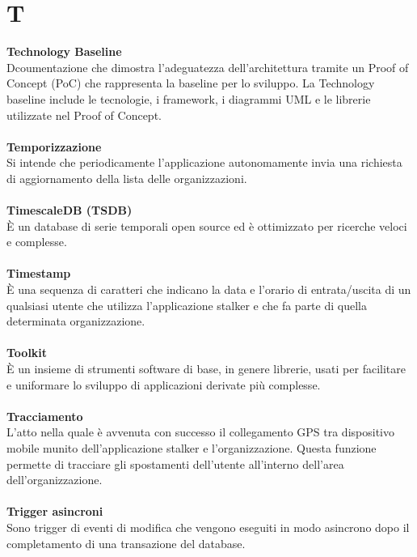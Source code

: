 \section{T}
\textbf{Technology Baseline}\\
Dcoumentazione che dimostra l'adeguatezza dell'architettura tramite un Proof of Concept (PoC) che rappresenta la baseline per lo sviluppo. La Technology baseline include le tecnologie, i framework, i diagrammi UML e le librerie utilizzate nel Proof of Concept. \\ \\
\textbf{Temporizzazione}\\
Si intende che periodicamente l'applicazione autonomamente invia una richiesta di aggiornamento della lista delle organizzazioni. \\ \\
\textbf{TimescaleDB (TSDB)}\\
È un database di serie temporali open source ed è ottimizzato per ricerche veloci e complesse. \\ \\
\textbf{Timestamp}\\
È una sequenza di caratteri che indicano la data e l'orario di entrata/uscita di un qualsiasi utente che utilizza l'applicazione stalker e che fa parte di quella determinata organizzazione. \\ \\
\textbf{Toolkit}\\
È un insieme di strumenti software di base, in genere librerie, usati per facilitare e uniformare lo sviluppo di applicazioni derivate più complesse. \\ \\
\textbf{Tracciamento}\\ 
L'atto nella quale è avvenuta con successo il collegamento GPS tra dispositivo mobile munito dell'applicazione stalker e l'organizzazione. Questa funzione permette di tracciare gli spostamenti dell'utente all'interno dell'area dell'organizzazione. \\ \\
\textbf{Trigger asincroni}\\
Sono trigger di eventi di modifica che vengono eseguiti in modo asincrono dopo il completamento di una transazione del database. \\ \\
\clearpage